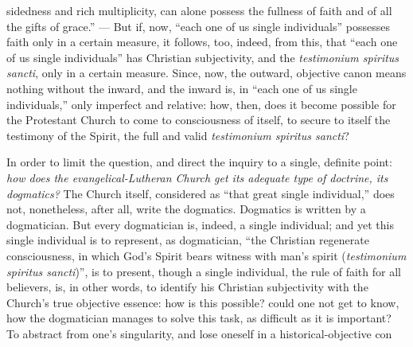 \documentclass[12pt]{book}
\begin{document}
sidedness and rich multiplicity, can alone possess the fullness of faith and of all the gifts of grace.'' --- But if, now, ``each one of us single individuals'' possesses faith only in a certain measure, it follows, too, indeed, from this, that ``each one of us single individuals'' has Christian subjectivity, and the \textit{testimonium spiritus sancti}, only in a certain measure. Since, now, the outward, objective canon means nothing without the inward, and the inward is, in ``each one of us single individuals,'' only imperfect and relative: how, then, does it become possible for the Protestant Church to come to consciousness of itself, to secure to itself the testimony of the Spirit, the full and valid \textit{testimonium spiritus sancti}?

In order to limit the question, and direct the inquiry to a single, definite point: \emph{how does the evangelical-Lutheran Church get its adequate type of doctrine, its dogmatics?} The Church itself, considered as ``that great single individual,'' does not, nonetheless, after all, write the dogmatics. Dogmatics is written by a dogmatician. But every dogmatician is, indeed, a single individual; and yet this single individual is to represent, as dogmatician, ``the Christian regenerate consciousness, in which God's Spirit bears witness with man's spirit (\textit{testimonium spiritus sancti})'', is to present, though a single individual, the rule of faith for all believers, is, in other words, to identify his Christian subjectivity with the Church's true objective essence: how is this possible? could one not get to know, how the dogmatician manages to solve this task, as difficult as it is important? To abstract from one's singularity, and lose oneself in a historical-objective con\-%
\end{document}
